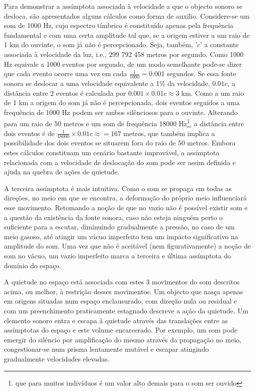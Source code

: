 \documentclass[../main.tex]{subfiles}
\begin{document}
Para demonstrar a assímptota associada à velocidade a que o objecto sonoro se desloca, são apresentados alguns cálculos como forma de auxílio. Considere-se um som de 1000 Hz, cujo espectro tímbrico é constituído apenas pela frequência fundamental e com uma certa amplitude tal que, se a origem estiver a um raio de 1 km do ouvinte, o som já não é percepcionado. Seja, também, '$c$' a constante associada à velocidade da luz, i.e., 299 792 458 metros por segundo\cite{penrose2004road}. Como 1000 Hz equivale a 1000 eventos por segundo, de um modo semelhante pode-se dizer que cada evento ocorre uma vez em cada $\frac{1}{1000} = 0.001$ segundos. Se essa fonte sonora se deslocar a uma velocidade equivalente a 1\% da velocidade, $0.01c$, a distância entre 2 eventos é calculada por $0.001 \times 0.01c \approx 3$ km. Como a um raio de 1 km a origem do som já não é percepcionada, dois eventos seguidos a uma frequência de 1000 Hz podem ser ambos silênciosos para o ouvinte. Alterando para um raio de 50 metros e um som de frequência 18000 Hz\footnote{que para muitos indivíduos é um valor alto demais para o som ser ouvido\cite{olson}}, a distância entre dois eventos é de $\frac{1}{18000}\times 0.01c \approx = 167$ metros, que também implica a possibilidade dos dois eventos se situarem fora do raio de 50 metros. Embora estes cálculos constituam um cenário bastante improvável, a assímptota relacionada com a velocidade de deslocação do som pode ser assim definida e ajuda na quebra de ações de quietude.

A terceira assímptota é mais intuitiva. Como o som se propaga em todas as direções, no meio em que se encontra, a deformação do próprio meio influenciará esse movimento. Retomando a noção de que no vazio não é possível existir som e a questão da existência da fonte sonora, caso não esteja ninguém perto o suficiente para a escutar, diminuindo gradualmente a pressão, no caso de um meio gasoso, até atingir um vácuo imperfeito tem um impacto significativo na amplitude do som\cite{kinsler2000fundamentals}. Uma vez que não é aceitável (nem figurativamente) a noção de som no vácuo, um vazio imperfeito marca a terceira e última assímptota do domínio do espaço.

A quietude no espaço está associada com estes 3 movimentos do som descritos acima, ou melhor, à restrição desses movimentos. Um objecto que nasça apenas em origens situadas num espaço enclausurado, com direção nula ou residual e com um preenchimento praticamente estagnado descreve a ação da quietude. Um elemento sonoro entra e escapa à quietude através das translações entre as assímptotas do espaço e este volume encarcerado. Por exemplo, um som pode emergir do silêncio por amplificação do mesmo através da propagação no meio, congestionar-se num prisma lentamente mutável e escapar atingindo gradualmente velocidades elevadas.
\end{document}
